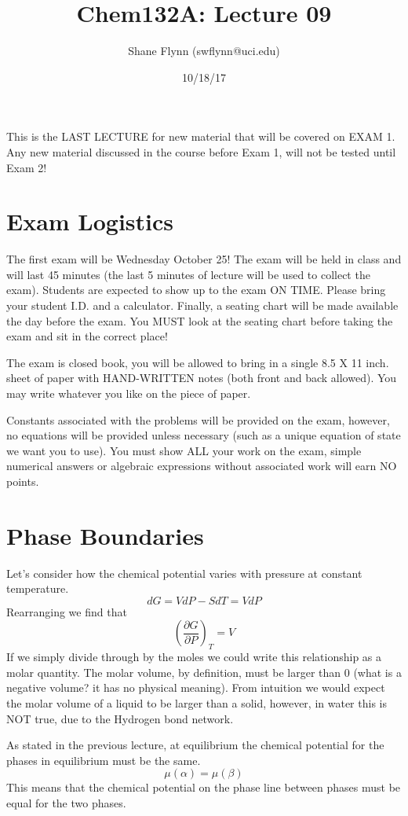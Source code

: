 \documentclass{article}
\title{Chem132A: Lecture 09}
\author{Shane Flynn (swflynn@uci.edu) }
\date{10/18/17}
\newcommand{\be}{\begin{equation}}
\newcommand{\ee}{\end{equation}}
\newcommand{\pd}{\partial}
\begin{document}
\maketitle

This is the LAST LECTURE for new material that will be covered on EXAM 1. 
Any new material discussed in the course before Exam 1, will not be tested until Exam 2!

\section*{Exam Logistics}
The first exam will be Wednesday October 25!
The exam will be held in class and will last 45 minutes (the last 5 minutes of lecture will be used to collect the exam). 
Students are expected to show up to the exam ON TIME. 
Please bring your student I.D. and a calculator. 
Finally, a seating chart will be made available the day before the exam.
You MUST look at the seating chart before taking the exam and sit in the correct place!

The exam is closed book, you will be allowed to bring in a single 8.5 X 11 inch. sheet of paper with HAND-WRITTEN notes (both front and back allowed). 
You may write whatever you like on the piece of paper. 

Constants associated with the problems will be provided on the exam, however, no equations will be provided unless necessary (such as a unique equation of state we want you to use).
You must show ALL your work on the exam, simple numerical answers or algebraic expressions without associated work will earn NO points. 

\section*{Phase Boundaries}
Let's consider how the chemical potential varies with pressure at constant temperature. 
\be
dG = VdP - SdT = VdP
\ee
Rearranging we find that
\be
\left( \frac{\pd G}{\pd P} \right)_T = V
\ee
If we simply divide through by the moles we could write this relationship as a molar quantity.
The molar volume, by definition, must be larger than 0 (what is a negative volume? it has no physical meaning). 
From intuition we would expect the molar volume of a liquid to be larger than a solid, however, in water this is NOT true, due to the Hydrogen bond network. 

As stated in the previous lecture, at equilibrium the chemical potential for the phases in equilibrium must be the same. 
\be
\mu(\alpha) = \mu(\beta)
\ee
This means that the chemical potential on the phase line between phases must be equal for the two phases. 
\end{document}
